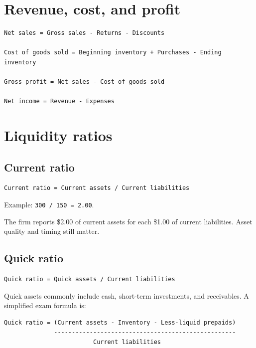 \documentclass[11pt,letterpaper,oneside,openany]{book}
\begin{document}
\section[Revenue, cost, and profit]{Revenue, cost, and profit}
\begin{Verbatim}[fontsize=\small,breaklines=true,breakanywhere=true,frame=single,framesep=2mm]
Net sales = Gross sales - Returns - Discounts

Cost of goods sold = Beginning inventory + Purchases - Ending inventory

Gross profit = Net sales - Cost of goods sold

Net income = Revenue - Expenses
\end{Verbatim}

\section[Liquidity ratios]{Liquidity ratios}
\subsection[Current ratio]{Current ratio}
\begin{Verbatim}[fontsize=\small,breaklines=true,breakanywhere=true,frame=single,framesep=2mm]
Current ratio = Current assets / Current liabilities
\end{Verbatim}

Example: \texttt{300 / 150 = 2.00}.


The firm reports \$2.00 of current assets for each \$1.00 of current liabilities. Asset quality and timing still matter.


\subsection[Quick ratio]{Quick ratio}
\begin{Verbatim}[fontsize=\small,breaklines=true,breakanywhere=true,frame=single,framesep=2mm]
Quick ratio = Quick assets / Current liabilities
\end{Verbatim}

Quick assets commonly include cash, short-term investments, and receivables. A simplified exam formula is:


\begin{Verbatim}[fontsize=\small,breaklines=true,breakanywhere=true,frame=single,framesep=2mm]
Quick ratio = (Current assets - Inventory - Less-liquid prepaids)
              ---------------------------------------------------
                         Current liabilities
\end{Verbatim}
\end{document}
